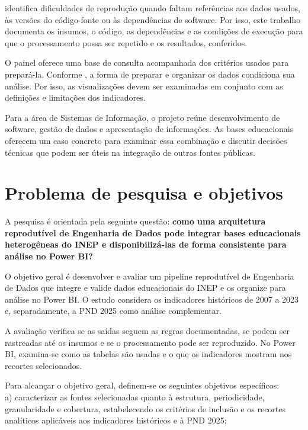  identifica dificuldades de reprodução quando faltam referências aos dados usados, às versões do código-fonte ou às dependências de software. Por isso, este trabalho documenta os insumos, o código, as dependências e as condições de execução para que o processamento possa ser repetido e os resultados, conferidos.

O painel oferece uma base de consulta acompanhada dos critérios usados para prepará-la. Conforme , a forma de preparar e organizar os dados condiciona sua análise. Por isso, as visualizações devem ser examinadas em conjunto com as definições e limitações dos indicadores.

Para a área de Sistemas de Informação, o projeto reúne desenvolvimento de software, gestão de dados e apresentação de informações. As bases educacionais oferecem um caso concreto para examinar essa combinação e discutir decisões técnicas que podem ser úteis na integração de outras fontes públicas.

\section{Problema de pesquisa e objetivos}

A pesquisa é orientada pela seguinte questão: \textbf{como uma arquitetura reprodutível de Engenharia de Dados pode integrar bases educacionais heterogêneas do INEP e disponibilizá-las de forma consistente para análise no Power BI?}

O objetivo geral é desenvolver e avaliar um pipeline reprodutível de Engenharia de Dados que integre e valide dados educacionais do INEP e os organize para análise no Power BI. O estudo considera os indicadores históricos de 2007 a 2023 e, separadamente, a PND 2025 como análise complementar.

A avaliação verifica se as saídas seguem as regras documentadas, se podem ser rastreadas até os insumos e se o processamento pode ser reproduzido. No Power BI, examina-se como as tabelas são usadas e o que os indicadores mostram nos recortes selecionados.

Para alcançar o objetivo geral, definem-se os seguintes objetivos específicos:\\

a) caracterizar as fontes selecionadas quanto à estrutura, periodicidade, granularidade e cobertura, estabelecendo os critérios de inclusão e os recortes analíticos aplicáveis aos indicadores históricos e à PND 2025;\\

